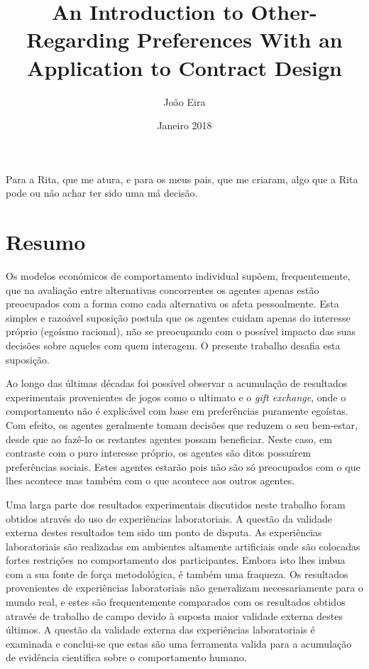 \documentclass[12pt]{article}
\title{An Introduction to Other-Regarding Preferences With an Application to Contract Design}
\author{João Eira}
\date{Janeiro 2018}
\newenvironment{dedication}
  {\clearpage           %
   \thispagestyle{empty}%
   \vspace*{\stretch{1}}%
   \itshape             %
   \centering         %
  }
  {\par %
   \vspace{\stretch{3}} %
   \clearpage           %
}
\newenvironment{agradecimentos}
  {\clearpage           %
   \thispagestyle{empty}%
   \vspace*{\stretch{1}}%
   \raggedright         %
  }
  {\par %
   \vspace{\stretch{3}} %
   \clearpage           %
}
\begin{document}
\begin{dedication}
Para a Rita, que me atura, e para os meus pais, que me criaram, algo que a Rita pode ou não achar ter sido uma má decisão.
\end{dedication}
\newpage
\newpage
\section*{Resumo}
Os modelos económicos de comportamento individual supõem, frequentemente, que na avaliação entre alternativas concorrentes os agentes apenas estão preocupados com a forma como cada alternativa os afeta pessoalmente. Esta simples e razoável suposição postula que os agentes cuidam apenas do interesse próprio (egoísmo racional), não se preocupando com o possível impacto das suas decisões sobre aqueles com quem interagem. O presente trabalho desafia esta suposição.

Ao longo das últimas décadas foi possível observar a acumulação de resultados experimentais provenientes de jogos como o ultimato e o \textit{gift exchange}, onde o comportamento não é explicável com base em preferências puramente egoístas. Com efeito, os agentes geralmente tomam decisões que reduzem o seu bem-estar, desde que ao fazê-lo os restantes agentes possam beneficiar. Neste caso, em contraste com o puro interesse próprio, os agentes são ditos possuírem preferências sociais. Estes agentes estarão pois não são só preocupados com o que lhes acontece mas também com o que acontece aos outros agentes.

Uma larga parte dos resultados experimentais discutidos neste trabalho foram obtidos através do uso de experiências laboratoriais. A questão da validade externa destes resultados tem sido um ponto de disputa. As experiências laboratoriais são realizadas em ambientes altamente artificiais onde são colocadas fortes restrições no comportamento dos participantes. Embora isto lhes imbua com a sua fonte de força metodológica, é também uma fraqueza. Os resultados provenientes de experiências laboratoriais não generalizam necessariamente para o mundo real, e estes são frequentemente comparados com os resultados obtidos através de trabalho de campo devido à suposta maior validade externa destes últimos. A questão da validade externa das experiências laboratoriais é examinada e conclui-se que estas são uma ferramenta valida para a acumulação de evidência cientifica sobre o comportamento humano.
\end{document}
